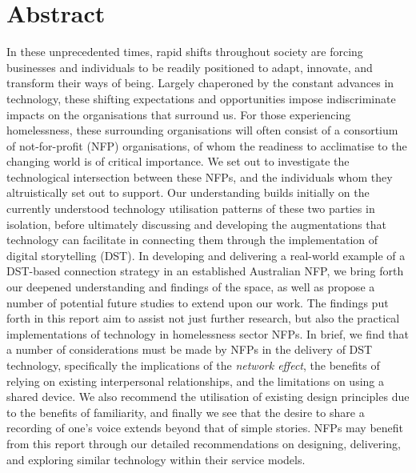 \chapter{Abstract}

In these unprecedented times, rapid shifts throughout society are forcing businesses and individuals to be readily positioned to adapt, innovate, and transform their ways of being. Largely chaperoned by the constant advances in technology, these shifting expectations and opportunities impose indiscriminate impacts on the organisations that surround us. For those experiencing homelessness, these surrounding organisations will often consist of a consortium of not-for-profit (NFP) organisations, of whom the readiness to acclimatise to the changing world is of critical importance. We set out to investigate the technological intersection between these NFPs, and the individuals whom they altruistically set out to support. Our understanding builds initially on the currently understood technology utilisation patterns of these two parties in isolation, before ultimately discussing and developing the augmentations that technology can facilitate in connecting them through the implementation of digital storytelling (DST). In developing and delivering a real-world example of a DST-based connection strategy in an established Australian NFP, we bring forth our deepened understanding and findings of the space, as well as propose a number of potential future studies to extend upon our work. The findings put forth in this report aim to assist not just further research, but also the practical implementations of technology in homelessness sector NFPs. In brief, we find that a number of considerations must be made by NFPs in the delivery of DST technology, specifically the implications of the \emph{network effect}, the benefits of relying on existing interpersonal relationships, and the limitations on using a shared device. We also recommend the utilisation of existing design principles due to the benefits of familiarity, and finally we see that the desire to share a recording of one's voice extends beyond that of simple stories. NFPs may benefit from this report through our detailed recommendations on designing, delivering, and exploring similar technology within their service models.